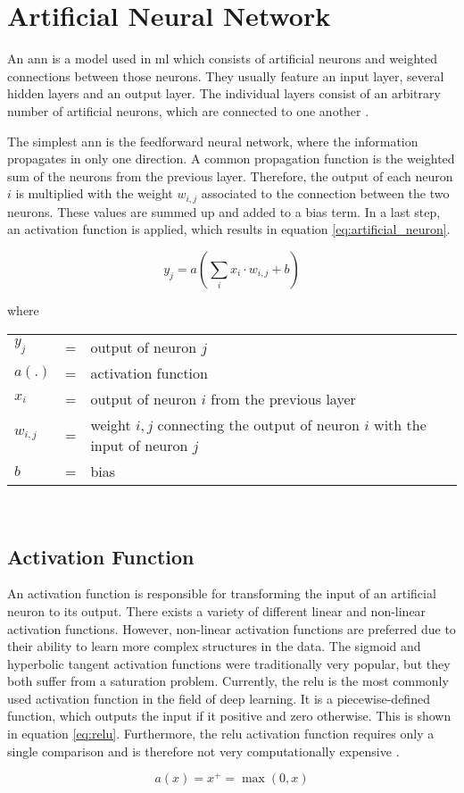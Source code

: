 \section{Artificial Neural Network}
\label{sec:theoretical_background:ann}

An \acrlong{ann} is a model used in \acrshort{ml} which consists of artificial neurons and weighted connections between those neurons.
They usually feature an input layer, several hidden layers and an output layer.
The individual layers consist of an arbitrary number of artificial neurons, which are connected to one another \cite[p.~33-36]{nn}.

The simplest \acrshort{ann} is the feedforward neural network, where the information propagates in only one direction.
A common propagation function is the weighted sum of the neurons from the previous layer.
Therefore, the output of each neuron $i$ is multiplied with the weight $w_{i, j}$ associated to the connection between the two neurons.
These values are summed up and added to a bias term.
In a last step, an activation function is applied, which results in equation \ref{eq:artificial_neuron}.

\begin{equation}
  y_j = a\left(\sum\limits_{i} x_i \cdot w_{i, j} + b\right)
  \label{eq:artificial_neuron}
\end{equation}

where

\begin{tabular}{lll}
  $y_j$ & = & output of neuron $j$ \\
  $a(.)$ & = & activation function \\
  $x_i$ & = & output of neuron $i$ from the previous layer \\
  $w_{i, j}$ & = & weight $i, j$ connecting the output of neuron $i$ with the input of neuron $j$ \\
  $b$ & = & bias \\
\end{tabular}
\\




\subsection{Activation Function}
\label{subsec:theoretical_background:ann:activation_function}

An activation function is responsible for transforming the input of an artificial neuron to its output.
There exists a variety of different linear and non-linear activation functions.
However, non-linear activation functions are preferred due to their ability to learn more complex structures in the data.
The sigmoid and hyperbolic tangent activation functions were traditionally very popular, but they both suffer from a saturation problem.
Currently, the \acrfull{relu} is the most commonly used activation function in the field of deep learning.
It is a piecewise-defined function, which outputs the input if it positive and zero otherwise.
This is shown in equation \ref{eq:relu}.
Furthermore, the \acrshort{relu} activation function requires only a single comparison and is therefore not very computationally expensive \cite{relu}.

\begin{equation}
  a(x) = x^+ = \max(0, x)
  \label{eq:relu}
\end{equation}
